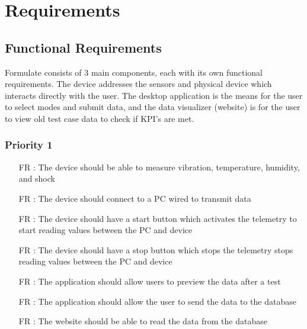 \documentclass[12pt]{article}
\newcounter{reqnum} %
\begin{document}
\section{Requirements}

\subsection{Functional Requirements}
Formulate consists of 3 main components, each with its own functional requirements. The device addresses the sensors and physical device which interacts directly with the user. The desktop application is the means for the user to select modes and submit data, and the data visualizer (website) is for the user to view old test case data to check if KPI's are met.

\subsubsection{Priority 1} 

\begin{itemize}
  
  \item[FR \refstepcounter{reqnum}\thereqnum:] The device should be able to measure vibration, temperature, humidity, and shock
  
  \item[FR \refstepcounter{reqnum}\thereqnum:] The device should connect to a PC wired to transmit data
  
  \item[FR \refstepcounter{reqnum}\thereqnum:] The device should have a start button which activates the telemetry to start reading values between the PC and device 
  
  \item[FR \refstepcounter{reqnum}\thereqnum:] The device should have a stop button which stops the telemetry stops reading values between the PC and device
  
  \item[FR \refstepcounter{reqnum}\thereqnum:] The application should allow users to preview the data after a test

  \item[FR \refstepcounter{reqnum}\thereqnum:] The application should allow the user to send the data to the database
  
  \item[FR \refstepcounter{reqnum}\thereqnum:] The website should be able to read the data from the database
  
  \end{itemize}
\end{document}
